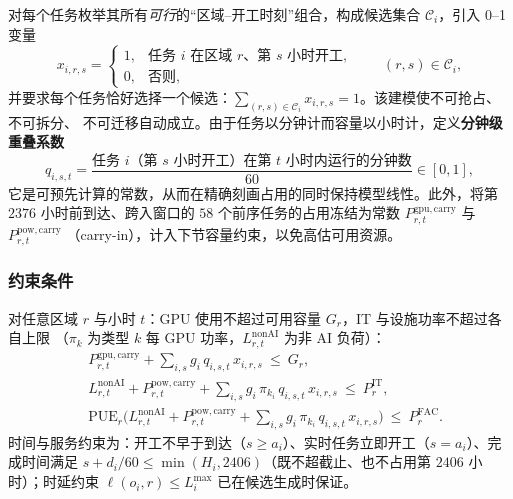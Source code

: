 \documentclass[UTF8,a4paper,zihao=-4]{ctexart}
\begin{document}
对每个任务枚举其所有\emph{可行}的“区域--开工时刻”组合，构成候选集合 $\mathcal{C}_i$，引入 0--1 变量
\begin{equation}
x_{i,r,s}=
\begin{cases}1, & \text{任务 }i\text{ 在区域 }r\text{、第 }s\text{ 小时开工},\\ 0,&\text{否则},\end{cases}
\qquad (r,s)\in\mathcal{C}_i,
\end{equation}
并要求每个任务恰好选择一个候选：$\sum_{(r,s)\in\mathcal{C}_i}x_{i,r,s}=1$。该建模使不可抢占、不可拆分、
不可迁移自动成立。由于任务以分钟计而容量以小时计，定义\textbf{分钟级重叠系数}
\begin{equation}
q_{i,s,t}=\frac{\text{任务 }i\text{（第 }s\text{ 小时开工）在第 }t\text{ 小时内运行的分钟数}}{60}\in[0,1],
\end{equation}
它是可预先计算的常数，从而在精确刻画占用的同时保持模型线性。此外，将第 $2376$ 小时前到达、跨入窗口的
$58$ 个前序任务的占用冻结为常数 $P^{\mathrm{gpu,carry}}_{r,t}$ 与 $P^{\mathrm{pow,carry}}_{r,t}$
（carry-in），计入下节容量约束，以免高估可用资源。

\subsubsection{约束条件}
对任意区域 $r$ 与小时 $t$：GPU 使用不超过可用容量 $G_r$，IT 与设施功率不超过各自上限
（$\pi_{k}$ 为类型 $k$ 每 GPU 功率，$L^{\mathrm{nonAI}}_{r,t}$ 为非 AI 负荷）：
\begin{align}
& P^{\mathrm{gpu,carry}}_{r,t}+\sum_{i,s} g_i\,q_{i,s,t}\,x_{i,r,s}\ \le\ G_r, \label{eq:c-gpu}\\
& L^{\mathrm{nonAI}}_{r,t}+P^{\mathrm{pow,carry}}_{r,t}+\sum_{i,s} g_i\,\pi_{k_i}\,q_{i,s,t}\,x_{i,r,s}
   \ \le\ P^{\mathrm{IT}}_r, \label{eq:c-it}\\
& \mathrm{PUE}_r\Big(L^{\mathrm{nonAI}}_{r,t}+P^{\mathrm{pow,carry}}_{r,t}
   +\textstyle\sum_{i,s} g_i\,\pi_{k_i}\,q_{i,s,t}\,x_{i,r,s}\Big)\ \le\ P^{\mathrm{FAC}}_r. \label{eq:c-fac}
\end{align}
时间与服务约束为：开工不早于到达（$s\ge a_i$）、实时任务立即开工（$s=a_i$）、完成时间满足
$s+d_i/60\le\min(H_i,2406)$（既不超截止、也不占用第 $2406$ 小时）；时延约束
$\ell(o_i,r)\le L_i^{\max}$ 已在候选生成时保证。
\end{document}
